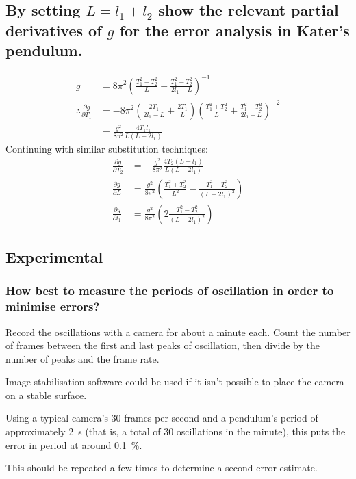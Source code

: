 \documentclass[a4paper]{scrartcl}
\begin{document}
\subsection{By setting \(L = l_1 + l_2\) show the relevant partial derivatives of \(g\) for the error analysis in Kater's pendulum.}
\begin{align*}
    g &= 8 \pi^2 \left(\frac{T_1^2 + T_2^2}{L} + \frac{T_1^2 - T_2^2}{2 l_1 - L}\right)^{-1} \\
    \therefore \frac{\partial g}{\partial T_1} &= -8 \pi ^2 \left(\frac{2 T_1}{2 l_1 - L} + \frac{2 T_1}{L}\right) \left(\frac{T_1^2 + T_2^2}{L} + \frac{T_1^2 - T_2^2}{2 l_1 - L}\right)^{-2} \\
    &= \frac{g^2}{8 \pi^2} \frac{4 T_1 l_1}{L (L - 2 l_1)}
\end{align*}
Continuing with similar substitution techniques:
\begin{align*}
    \frac{\partial g}{\partial T_2} &= -\frac{g^2}{8 \pi^2} \frac{4 T_2 (L - l_1)}{L (L - 2 l_1)} \\
    \frac{\partial g}{\partial L} &= \frac{g^2}{8 \pi^2} \left(\frac{T_1^2 + T_2^2}{L^2} - \frac{T_1^2 - T_2^2}{(L - 2 l_1)^2}\right) \\
    \frac{\partial g}{\partial l_1} &= \frac{g^2}{8 \pi^2} \left(2 \frac{T_1^2 - T_2^2}{(L - 2 l_1)^2}\right)
\end{align*}

\subsection{Experimental}
\subsubsection{How best to measure the periods of oscillation in order to minimise errors?}
Record the oscillations with a camera for about a minute each. Count the number of frames between the first and last peaks of oscillation, then divide by the number of peaks and the frame rate.

Image stabilisation software could be used if it isn't possible to place the camera on a stable surface.

Using a typical camera's 30 frames per second and a pendulum's period of approximately \SI{2}{\second} (that is, a total of 30 oscillations in the minute), this puts the error in period at around \SI{0.1}{\percent}.

This should be repeated a few times to determine a second error estimate.
\end{document}
